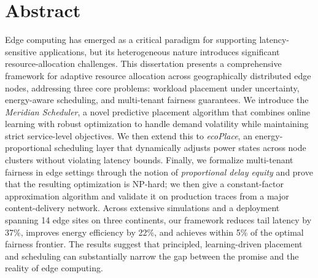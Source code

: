 \chapter*{Abstract}
\thispagestyle{plain}

Edge computing has emerged as a critical paradigm for supporting
latency-sensitive applications, but its heterogeneous nature introduces
significant resource-allocation challenges. This dissertation presents a
comprehensive framework for adaptive resource allocation across geographically
distributed edge nodes, addressing three core problems: workload placement
under uncertainty, energy-aware scheduling, and multi-tenant fairness
guarantees. We introduce the \emph{Meridian Scheduler}, a novel predictive
placement algorithm that combines online learning with robust optimization to
handle demand volatility while maintaining strict service-level objectives. We
then extend this to \emph{ecoPlace}, an energy-proportional scheduling layer
that dynamically adjusts power states across node clusters without violating
latency bounds. Finally, we formalize multi-tenant fairness in edge settings
through the notion of \emph{proportional delay equity} and prove that the
resulting optimization is NP-hard; we then give a constant-factor approximation
algorithm and validate it on production traces from a major content-delivery
network. Across extensive simulations and a deployment spanning 14 edge sites on
three continents, our framework reduces tail latency by 37\%, improves energy
efficiency by 22\%, and achieves within 5\% of the optimal fairness frontier.
The results suggest that principled, learning-driven placement and scheduling can
substantially narrow the gap between the promise and the reality of edge computing.

\cleardoublepage
{}
{}
\renewcommand{\contentsname}{Table of Contents}
\tableofcontents
\thispagestyle{plain}

\cleardoublepage
{}
{}
\listoffigures
\thispagestyle{plain}

\cleardoublepage
{}
{}
\listoftables
\thispagestyle{plain}

